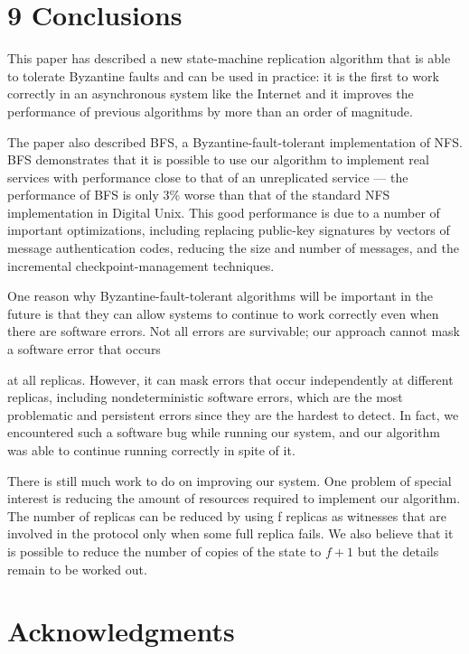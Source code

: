 \documentclass[
]{article}
\begin{document}
\section{9 Conclusions}\label{conclusions}

This paper has described a new state-machine replication algorithm that
is able to tolerate Byzantine faults and can be used in practice: it is
the first to work correctly in an asynchronous system like the Internet
and it improves the performance of previous algorithms by more than an
order of magnitude.

The paper also described BFS, a Byzantine-fault-tolerant implementation
of NFS. BFS demonstrates that it is possible to use our algorithm to
implement real services with performance close to that of an
unreplicated service --- the performance of BFS is only 3\% worse than
that of the standard NFS implementation in Digital Unix. This good
performance is due to a number of important optimizations, including
replacing public-key signatures by vectors of message authentication
codes, reducing the size and number of messages, and the incremental
checkpoint-management techniques.

One reason why Byzantine-fault-tolerant algorithms will be important in
the future is that they can allow systems to continue to work correctly
even when there are software errors. Not all errors are survivable; our
approach cannot mask a software error that occurs

at all replicas. However, it can mask errors that occur independently at
different replicas, including nondeterministic software errors, which
are the most problematic and persistent errors since they are the
hardest to detect. In fact, we encountered such a software bug while
running our system, and our algorithm was able to continue running
correctly in spite of it.

There is still much work to do on improving our system. One problem of
special interest is reducing the amount of resources required to
implement our algorithm. The number of replicas can be reduced by using
f replicas as witnesses that are involved in the protocol only when some
full replica fails. We also believe that it is possible to reduce the
number of copies of the state to \(f + 1\) but the details remain to be
worked out.

\section{Acknowledgments}\label{acknowledgments}
\end{document}
